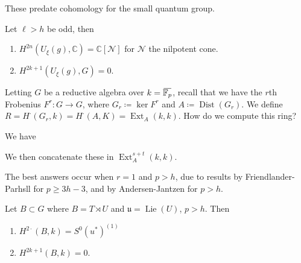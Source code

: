 These predate cohomology for the small quantum group.

\begin{theorem}

Let \(\ell > h\) be odd, then

\begin{enumerate}
\def\labelenumi{\arabic{enumi}.}
\item
  \(H^{2n}(U_\xi(g), {\mathbb{C}}) = {\mathbb{C}}[\mathcal{N}]\) for
  \(\mathcal{N}\) the nilpotent cone.
\item
  \(H^{2k+1}(U_\xi(g), G) = 0\).
\end{enumerate}

\end{theorem}

Letting \(G\) be a reductive algebra over
\(k = \mkern 1.5mu\overline{\mkern-1.5mu{\mathbb{F}}_p\mkern-1.5mu}\mkern 1.5mu\),
recall that we have the \(r\)th Frobenius \(F^r:G\to G\), where
\(G_r \coloneqq\ker F^r\) and \(A \coloneqq\operatorname{Dist}(G_r)\).
We define
\(R = H^\cdot(G_r, k) = H^\cdot(A, K) = \operatorname{Ext}_A(k, k)\).
How do we compute this ring?

We have

\begin{center}
\end{center}

We then concatenate these in \(\operatorname{Ext}_A^{s+t}(k, k)\).

The best answers occur when \(r=1\) and \(p>h\), due to results by
Friendlander-Parhsll for \(p\geq 3h-3\), and by Andersen-Jantzen for
\(p>h\).

\begin{proposition}[?]

Let \(B \subset G\) where \(B = T\rtimes U\) and
\(\mathfrak{u} = \operatorname{Lie}(U)\), \(p> h\). Then

\begin{enumerate}
\def\labelenumi{\arabic{enumi}.}
\item
  \(H^{2\cdot}(B, k) = S^0(u^*)^{(1)}\)
\item
  \(H^{2k+1}(B, k) = 0\).
\end{enumerate}

\end{proposition}

